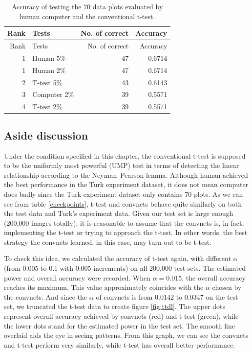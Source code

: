 \documentclass[12pt]{article}
\begin{document}
\begin{longtable}[]{@{}rlrr@{}}
\caption{Accuracy of testing the 70 data plots evaluated by human
computer and the conventional t-test.}\tabularnewline
\toprule
Rank & Tests & No. of correct & Accuracy\tabularnewline
\midrule
\endfirsthead
\toprule
Rank & Tests & No. of correct & Accuracy\tabularnewline
\midrule
\endhead
1 & Human 5\% & 47 & 0.6714\tabularnewline
1 & Human 2\% & 47 & 0.6714\tabularnewline
2 & T-test 5\% & 43 & 0.6143\tabularnewline
3 & Computer 2\% & 39 & 0.5571\tabularnewline
4 & T-test 2\% & 39 & 0.5571\tabularnewline
\bottomrule
\end{longtable}

\subsection{Aside discussion}\label{aside-discussion}

Under the condition specified in this chapter, the conventional t-test
is supposed to be the uniformly most powerful (UMP) test in terms of
detecting the linear relationship according to the Neyman--Pearson
lemma. \citep{Neyman289} Although human achieved the best performance in
the Turk experiment dataset, it does not mean computer does badly since
the Turk experiment dataset only contains 70 plots. As we can see from
table \ref{checkpoints}, t-test and convnets behave quite similarly on
both the test data and Turk's experiment data. Given our test set is
large enough (200,000 images totally), it is reasonable to assume that
the convnets is, in fact, implementing the t-test or trying to approach
the t-test. In other words, the best strategy the convnets learned, in
this case, may turn out to be t-test.

To check this idea, we calculated the accuracy of t-test again, with
different \(\alpha\) (from 0.005 to 0.1 with 0.005 increments) on all
200,000 test sets. The estimated power and overall accuracy were
recorded. When \(\alpha=0.015\), the overall accuracy reaches its
maximum. This value approximately coincides with the \(\alpha\) chosen
by the convnets. And since the \(\alpha\) of convnets is from 0.0142 to
0.0347 on the test set, we truncated the t-test data to create figure
\ref{fig:ttdl}. The upper dots represent overall accuracy achieved by
convnets (red) and t-test (green), while the lower dots stand for the
estimated power in the test set. The smooth line overlaid aids the eye
in seeing patterns. From this graph, we can see the convnets and t-test
perform very similarly, while t-test has overall better performance.
\end{document}
